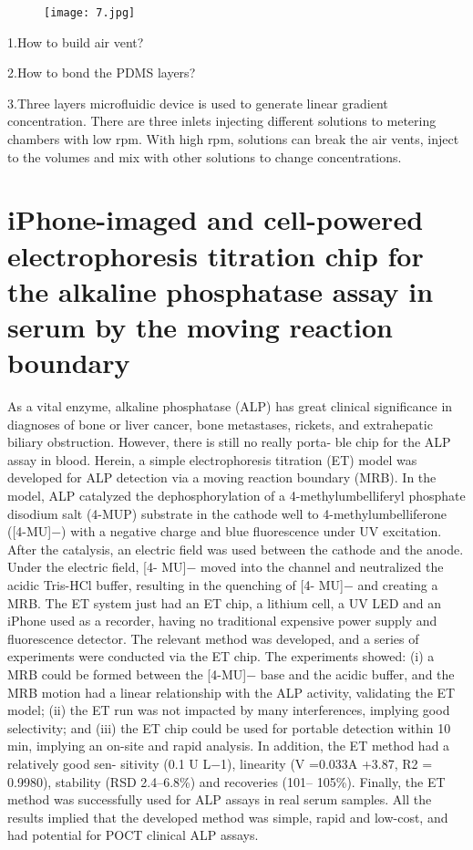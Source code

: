 \documentclass{article}
\begin{document}
\begin{figure}[H]
\centering
\texttt{[image: 7.jpg]}
\end{figure}

1.How to build air vent?

2.How to bond the PDMS layers?

3.Three layers microfluidic device is used to generate linear gradient concentration. There are three inlets injecting different solutions to metering chambers with low rpm. With high rpm, solutions can break the air vents, inject to the volumes and mix with other solutions to change concentrations.

\part{iPhone-imaged and cell-powered electrophoresis titration chip for the alkaline phosphatase assay in serum by the moving reaction boundary}

As a vital enzyme, alkaline phosphatase (ALP) has great clinical significance in diagnoses of bone or liver cancer, bone metastases, rickets, and extrahepatic biliary obstruction. However, there is still no really porta- ble chip for the ALP assay in blood. Herein, a simple electrophoresis titration (ET) model was developed for ALP detection via a moving reaction boundary (MRB). In the model, ALP catalyzed the dephosphorylation of a 4-methylumbelliferyl phosphate disodium salt (4-MUP) substrate in the cathode well to 4-methylumbelliferone ([4-MU]−) with a negative charge and blue fluorescence under UV excitation. After the catalysis, an electric field was used between the cathode and the anode. Under the electric field, [4- MU]− moved into the channel and neutralized the acidic Tris-HCl buffer, resulting in the quenching of [4- MU]− and creating a MRB. The ET system just had an ET chip, a lithium cell, a UV LED and an iPhone used as a recorder, having no traditional expensive power supply and fluorescence detector. The relevant method was developed, and a series of experiments were conducted via the ET chip. The experiments showed: (i) a MRB could be formed between the [4-MU]− base and the acidic buffer, and the MRB motion had a linear relationship with the ALP activity, validating the ET model; (ii) the ET run was not impacted by many interferences, implying good selectivity; and (iii) the ET chip could be used for portable detection within 10 min, implying an on-site and rapid analysis. In addition, the ET method had a relatively good sen- sitivity (0.1 U L−1), linearity (V =0.033A +3.87, R2 = 0.9980), stability (RSD 2.4–6.8\%) and recoveries (101– 105\%). Finally, the ET method was successfully used for ALP assays in real serum samples. All the results implied that the developed method was simple, rapid and low-cost, and had potential for POCT clinical ALP assays.
\end{document}
